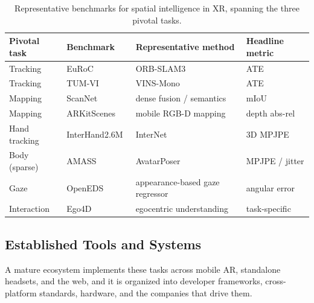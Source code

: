 \begin{table}[!ht]
\centering
\fontsize{8}{10}\selectfont
\setlength{\tabcolsep}{1.0mm}
\caption{Representative benchmarks for spatial intelligence in XR, spanning the three pivotal tasks.}
\label{tab:p4_s10_1_benchmarks}
\begin{tabular}{L{0.16\textwidth} L{0.25\textwidth} L{0.30\textwidth} L{0.20\textwidth}}
\toprule
\textbf{Pivotal task} & \textbf{Benchmark} & \textbf{Representative method} & \textbf{Headline metric} \\
\midrule
Tracking & EuRoC~\cite{Burri2016EuRoC} & ORB-SLAM3~\cite{Campos2021ORBSLAM3} & ATE \\
Tracking & TUM-VI~\cite{Schubert2018TUMVI} & VINS-Mono~\cite{qin2018vins} & ATE \\
Mapping & ScanNet~\cite{dai2017scannet} & dense fusion / semantics & mIoU \\
Mapping & ARKitScenes~\cite{baruch2021arkitscenes} & mobile RGB-D mapping & depth abs-rel \\
Hand tracking & InterHand2.6M~\cite{moon2020interhand2} & InterNet~\cite{moon2020interhand2} & 3D MPJPE \\
Body (sparse) & AMASS~\cite{mahmood2019amass} & AvatarPoser~\cite{jiang2022avatarposer} & MPJPE / jitter \\
Gaze & OpenEDS~\cite{garbin2019openeds} & appearance-based gaze regressor & angular error \\
Interaction & Ego4D~\cite{grauman2022ego4d} & egocentric understanding & task-specific \\
\bottomrule
\end{tabular}
\end{table}

\subsection{Established Tools and Systems}
\label{subsec:p4-sec10-1-established-tools-and-systems}

A mature ecosystem implements these tasks across mobile AR, standalone headsets, and the web, and it is organized into developer frameworks, cross-platform standards, hardware, and the companies that drive them.

